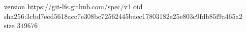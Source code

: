 version https://git-lfs.github.com/spec/v1
oid sha256:3cbd7eed5618acc7e308bc72562445baec17803182e25e803c9fdb85f9a465a2
size 349676
